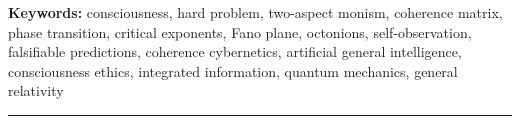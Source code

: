 \documentclass[10pt,letterpaper]{article}
\theoremstyle{uhm}
\begin{document}
\vspace{8pt}

\noindent\textbf{Keywords:} consciousness, hard problem, two-aspect monism, coherence matrix,
phase transition, critical exponents, Fano plane, octonions, self-observation,
falsifiable predictions, coherence cybernetics, artificial general intelligence,
consciousness ethics, integrated information, quantum mechanics, general relativity

\vspace{12pt}
\hrule
\vspace{12pt}

\tableofcontents
\newpage













\appendix







\label{LastPage}
\end{document}
